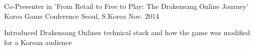 

\begin{cventries}

  \cventry
    {Co-Presenter in 'From Retail to Free to Play: The Drakensang Online Journey'} %
    {Korea Game Conference} %
    {Seoul, S.Korea} %
    {Nov. 2014} %
    {
      \begin{cvitems} %
        \item {Introduced Drakensang Onlines technical stack and how the game was modified for a Korean audience}
      \end{cvitems}
    }

\end{cventries}
